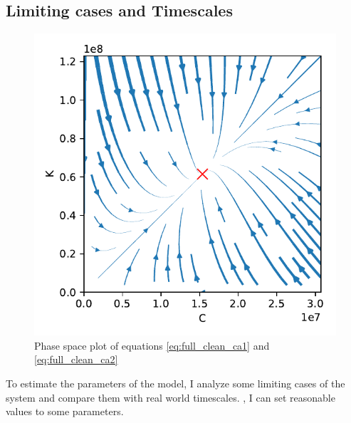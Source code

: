 \newpage
\subsection{Limiting cases and Timescales} 
\label{sec:limiting_cases}


\begin{figure}
        \hspace{-1.5 cm}\includegraphics[width = .65 \textwidth]{./figures/phasespace.pdf}
        \caption[Phase space plot of a full clean economy]{Phase space plot of equations \eqref{eq:full_clean_ca1} and \eqref{eq:full_clean_ca2} \label{phase_space_plot}}
\end{figure}

To estimate the parameters of the model, I analyze some limiting cases of the system and compare them with real world timescales. , I can set reasonable values to some parameters.


